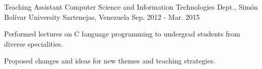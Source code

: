 \begin{cventries}
  \cventry
    {Teaching Assistant}
    {Computer Science and Information Technologies Dept., Sim\'on Bol\'ivar University}
    {Sartenejas, Venezuela}
    {Sep. 2012 - Mar. 2015}
    {
      \begin{cvitems}
        \item {Performed lectures on C language programming to undergrad students from diverse specialities.}
        \item {Proposed changes and ideas for new themes and teaching strategies.}
      \end{cvitems}
    }
\end{cventries}
